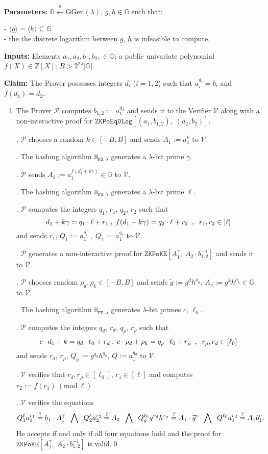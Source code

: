 \documentclass[11pt, lettersize, notitlepage, leqno, footskip=0.6cm]{article}
\newcommand{\bz}{\mathbb Z}
\newcommand{\ttt}{\texttt}
\newcommand{\bG}{\mathbb{G}}
\newcommand{\la}{\langle}
\newcommand{\ra}{\rangle}
\newcommand{\wti}{\widetilde}
\newcommand{\mc}{\mathcal}
\newcommand{\mb}{\mathbb}
\newcommand{\mr}{\mathrm}
\newcommand{\lam}{\lambda}
\newcommand{\lamb}{\lambda}
\newcommand{\sub}{\subseteq}
\newcommand{\mP}{\mc{P}}
\newcommand{\V}{\mc{V}}
\newcommand{\vs}{\vspace{-0.15cm}}
\newcommand{\noin}{\noindent}
\newcommand{\sta}{\stackrel{?}{=}}
\newcommand{\Mod}[1]{\ (\mathrm{mod}\ #1)}
\numberwithin{equation}{section}
\begin{document}
\noin \textbf{Parameters:} $\mb{G}\xleftarrow{\$} \mr{GGen}(\lamb)$,  $g,h\in \mb{G}$ such that:

\noin - $\la g \ra = \la h \ra\sub \bG$ \\
\noin - the the discrete logarithm between $g$, $h$ is infeasible to compute.

\noin \textbf{Inputs:} Elements $a_1,a_2, b_1, b_2,  \in \mb{G}$; a public univariate polynomial $f(X)\in \bz[X]$; $B > 2^{2\lam}|\bG|$

\noin \textbf{Claim:} The Prover possesses integers $d_i$ ($i=1,2$) such that $a_i^{d_i} = b_i$ and $f(d_1) = d_2$.

\begin{enumerate}[wide, labelwidth=!, labelindent=0pt]\vs \item  The Prover $\mP$ computes $b_{1,2}:= a_1^{d_2}$ and sends it to the Verifier $\V$ along with a non-interactive proof for $\ttt{ZKPoEqDLog}[(a_1,b_{1,2}),\;(a_2,b_2)]$.

\noin 2. $\mP$ chooses a random $k\in[-B,B]$ and sends $A_1:= a_1^{k}$ to $\V$.

\noin 3. The hashing algorithm $\ttt{H}_{\ttt{FS},\lam}$ generates a $\lam$-bit prime $\gamma$.

\noin 4. $\mP$ sends $A_2:= a_1^{f(d_1+k\gamma)}\in\bG$ to $\V$.

\noin 5. The hashing algorithm $\ttt{H}_{\ttt{FS},\lam}$ generates a $\lam$-bit prime $\ell$.

\noin 6. $\mP$ computes the integers $q_1$, $r_1$, $q_2$, $r_2$ such that \vs $$d_1+k\gamma = q_1\cdot \ell + r_1\;,\; f(d_1+k\gamma) = q_2\cdot \ell + r_2\;\;,\;\;r_1,r_2\in [\ell]   \vs $$ and sends $r_1$, $Q_1:= a_1^{q_1}\;,\; Q_2:= a_1^{q_2}$ to $\V$.

\noin 7. $\mP$ generates a non-interactive proof for $\ttt{ZKPoKE}[A_1^{\gamma},\; A_2\cdot b_{1,2}^{-1}]$ and sends it to $\V$.

\noin 8. $\mP$ chooses random $\rho_d,\rho_k\in [-B, B]$ and sends $\wti{g}:= g^d h^{\rho_d}$, $A_g:= g^k h^{\rho_k}\in \bG$ to $\V$.

\noin 9. The hashing algorithm $\ttt{H}_{\ttt{FS},\lam}$ generates $\lam$-bit primes $c$, $\ell_0$. 

\noin 10. $\mP$ computes the integers $q_d$, $r_d$, $q_{\rho}$, $r_{\rho}$ such that \vs $$c\cdot d_1 + k = q_d\cdot \ell_0 + r_d\;,\; c\cdot \rho_d + \rho_k = q_{\rho}\cdot \ell_0 + r_{\rho}\;\;,\;\;r_{\rho},r_d\in [\ell_0] \vs $$ and sends $r_{d}$, $r_{\rho}$, $Q_g:= g^{q_d}h^{q_{\rho}}$, $Q:= a_1^{q_d}$ to $\V$.

\noin 11. $\V$ verifies that $r_{d}, r_{\rho}\in [\ell_0]$, $r_1\in [\ell]$ and computes $r_2:= f(r_1)\Mod{\ell}$.

\noin 12. $\V$ verifies the equations \vs $$Q_1^{\ell}a_1^{r_1} \sta b_1 \cdot A_1^{\gamma}\;\;\bigwedge\;\; Q_2^{\ell}a_2^{r_2} \sta A_2 \;\;\bigwedge\;\; Q_g^{\ell_0}g^{r_d}h^{r_{\rho}}\sta A_1\cdot \wti{g}^c \;\;\bigwedge\;\; Q^{\ell_0}a_1^{r_d}\sta A_1 b_1^c .\vs $$ He accepts if and only if all four equations hold and the proof for $\ttt{ZKPoKE}[A_1^{\gamma},\; A_2\cdot b_{1,2}^{-1}]$ is valid.\qed \end{enumerate}
\end{document}
